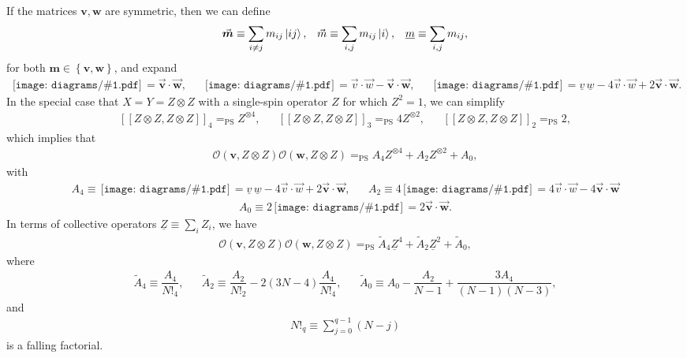 \documentclass[nofootinbib,notitlepage,11pt]{revtex4-2}
\newcommand{\f}[2]{\dfrac{#1}{#2}} %
\newcommand{\p}[1]{\left(#1\right)} %
\renewcommand{\sp}[1]{\left[#1\right]} %
\newcommand{\spp}[1]{\sp{\sp{#1}}} %
\renewcommand{\set}[1]{\left\{#1\right\}} %
\renewcommand{\c}{\cdot} %
\newcommand{\m}{\bm} %
\renewcommand{\v}{\vec} %
\newcommand{\1}{\mathds{1}}
\renewcommand{\O}{\mathcal{O}}
\newcommand{\EQPS}{=_{\text{PS}}}
\newcommand{\col}{\underline}
\newcommand{\diagram}[1]
{\,\texttt{[image: diagrams/\#1.pdf]}\,}
\begin{document}
If the matrices $\m v,\m w$ are symmetric, then we can define
\begin{align}
  \v{\m m} \equiv \sum_{i\ne j} m_{ij} \ket{ij},
  &&
  \v m \equiv \sum_{i,j} m_{ij} \ket{i},
  &&
  \col{m} \equiv \sum_{i,j} m_{ij},
\end{align}
for both $\m m\in\set{\m v,\m w}$, and expand
\begin{align}
  \diagram{prod_b22_c2} = \v{\m v} \c\v{\m w},
  &&
  \diagram{prod_b22_c1} =
  \v v \c \v w - \v{\m v} \c \v{\m w},
  &&
  \diagram{prod_b22_c0}
  = \col{v}\,\col{w} - 4 \v v\c\v w + 2 \v{\m v}\c\v{\m w}.
\end{align}
In the special case that $X=Y=Z\otimes Z$ with a single-spin operator
$Z$ for which $Z^2=1$, we can simplify
\begin{align}
  \spp{Z\otimes Z,Z\otimes Z}_4 \EQPS Z^{\otimes 4},
  &&
  \spp{Z\otimes Z,Z\otimes Z}_3 \EQPS 4 Z^{\otimes 2},
  &&
  \spp{Z\otimes Z,Z\otimes Z}_2 \EQPS 2,
\end{align}
which implies that
\begin{align}
  \O\p{\m v,Z\otimes Z} \O\p{\m w,Z\otimes Z}
  \EQPS A_4 Z^{\otimes 4} + A_2 Z^{\otimes 2} + A_0,
\end{align}
with
\begin{align}
  A_4 \equiv \diagram{prod_b22_c0}
  = \col{v}\,\col{w} - 4 \v v\c\v w + 2 \v{\m v}\c\v{\m w},
  &&
  A_2 \equiv 4 \diagram{prod_b22_c1}
  = 4 \v v \c \v w - 4 \v{\m v} \c \v{\m w}
\end{align}
\begin{align}
  A_0 \equiv 2 \diagram{prod_b22_c2} = 2 \v{\m v} \c\v{\m w}.
\end{align}
In terms of collective operators $\col{Z}\equiv\sum_iZ_i$, we have
\begin{align}
  \O\p{\m v,Z\otimes Z} \O\p{\m w,Z\otimes Z}
  \EQPS \tilde A_4 \col{Z}^4 + \tilde A_2 \col{Z}^2 + \tilde A_0,
\end{align}
where
\begin{align}
  \tilde A_4 \equiv \f{A_4}{N!_4},
  &&
  \tilde A_2 \equiv \f{A_2}{N!_2} - 2\p{3N-4} \f{A_4}{N!_4},
  &&
  \tilde A_0 \equiv A_0 - \f{A_2}{N-1} + \f{3A_4}{\p{N-1}\p{N-3}},
\end{align}
and
\begin{align}
  N!_q \equiv \sum_{j=0}^{q-1} \p{N-j}
\end{align}
is a falling factorial.

\end{document}
